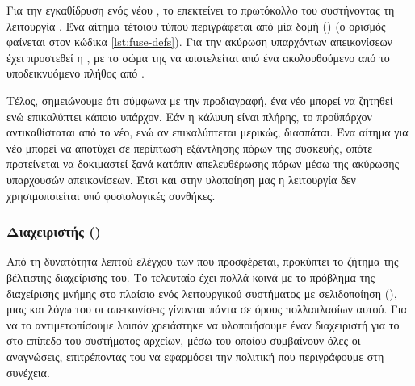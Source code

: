 Για την εγκαθίδρυση ενός νέου , το \viofs{} επεκτείνει το πρωτόκολλο
του  συστήνοντας τη λειτουργία . Ένα αίτημα
τέτοιου τύπου περιγράφεται από μία δομή ()
 (ο ορισμός φαίνεται στον κώδικα
\ref{lst:fuse-defs}). Για την ακύρωση υπαρχόντων απεικονίσεων έχει προστεθεί η
, με το σώμα της να αποτελείται από ένα  ακολουθούμενο από το υποδεικνυόμενο πλήθος από
.

Τέλος, σημειώνουμε ότι σύμφωνα με την προδιαγραφή, ένα νέο  μπορεί
να ζητηθεί ενώ επικαλύπτει κάποιο υπάρχον. Εάν η κάλυψη είναι πλήρης, το
προϋπάρχον αντικαθίσταται από το νέο, ενώ αν επικαλύπτεται μερικώς, διασπάται.
Ένα αίτημα για νέο  μπορεί να αποτύχει σε περίπτωση εξάντλησης
πόρων της συσκευής, οπότε προτείνεται να δοκιμαστεί ξανά κατόπιν απελευθέρωσης
πόρων μέσω της ακύρωσης υπαρχουσών απεικονίσεων. Έτσι και στην υλοποίηση μας η
λειτουργία  δεν χρησιμοποιείται υπό φυσιολογικές
συνθήκες.

\subsubsection{Διαχειριστής ()}

Από τη δυνατότητα λεπτού ελέγχου των  που προσφέρεται,
προκύπτει το ζήτημα της βέλτιστης διαχείρισης του. Το τελευταίο έχει πολλά κοινά
με το πρόβλημα της διαχείρισης μνήμης στο πλαίσιο ενός λειτουργικού συστήματος
με σελιδοποίηση (), μιας και λόγω του  οι
απεικονίσεις γίνονται πάντα σε όρους πολλαπλασίων αυτού. Για να το
αντιμετωπίσουμε λοιπόν χρειάστηκε να υλοποιήσουμε έναν διαχειριστή για το
 στο επίπεδο του συστήματος αρχείων, μέσω του οποίου συμβαίνουν
όλες οι αναγνώσεις, επιτρέποντας του να εφαρμόσει την πολιτική που περιγράφουμε
στη συνέχεια.


